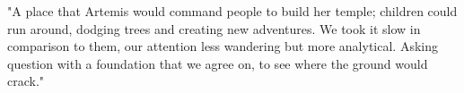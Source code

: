 \begin{Document}
            "A place that Artemis would command people to build her temple; children could run around, dodging trees and creating new adventures. We took it slow
        in comparison to them, our attention less wandering but more analytical. Asking question with a foundation that we agree on, to see where the ground would
        crack."
\end{Document}
